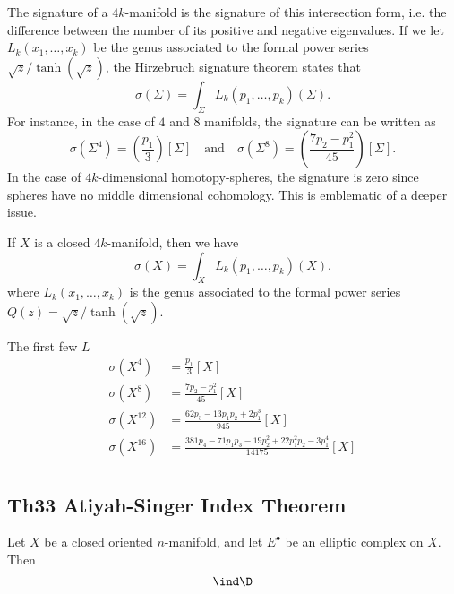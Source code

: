 The signature of a $4k$-manifold is the signature of this intersection form, i.e. the difference between the number of its positive and negative eigenvalues. If we let $L_k(x_1,\ldots, x_k)$ be the genus associated to the formal power series $\sqrt{z}/\tanh(\sqrt{z})$, the Hirzebruch signature theorem states that
\[
	\sigma(\Sigma) = \int_\Sigma L_k(p_1,\ldots, p_k)(\Sigma).
\]
For instance, in the case of $4$ and $8$ manifolds, the signature can be written as
\[
	\sigma(\Sigma^4) = \left(\frac{p_1}{3}\right)[\Sigma]
	\quad\textrm{and}\quad
	\sigma(\Sigma^8) = \left(\frac{7p_2 - p_1^2}{45}\right)[\Sigma].
\]
In the case of $4k$-dimensional homotopy-spheres, the signature is zero since spheres have no middle dimensional cohomology. This is emblematic of a deeper issue.

\begin{theorem}
	If $X$ is a closed $4k$-manifold, then we have
	\[
		\sigma(X) 
	 = \int_X L_k(p_1,\ldots, p_k)(X).
	\]
	where $L_k(x_1,\ldots,x_k)$ is the genus associated to the formal power series $Q(z) = \sqrt{z}/\tanh(\sqrt{z})$.
\end{theorem}

\begin{example}
	The first few $L$
	\[
		\begin{aligned}
			\sigma(X^4) &= \frac{p_1}{3}[X]\\
			\sigma(X^8) &= \frac{7p_2-p_1^2}{45}[X]\\
			\sigma(X^{12}) &= \frac{62p_3-13p_1p_2+2p_1^3}{945}[X]\\
			\sigma(X^{16}) &= \frac{381p_4 - 71p_1p_3 - 19p_2^2 + 22p_1^2p_2 - 3p_1^4}{14175}[X]\\
		\end{aligned}
	\]
\end{example}


\subsection*{Th33 Atiyah-Singer Index Theorem}

\begin{theorem}\label{thm:atiyah-singer-index}
  Let $X$ be a closed oriented $n$-manifold, and let $E^\bullet$ be an elliptic complex on $X$. Then
  \[
    \ind \D
  \]
\end{theorem}
